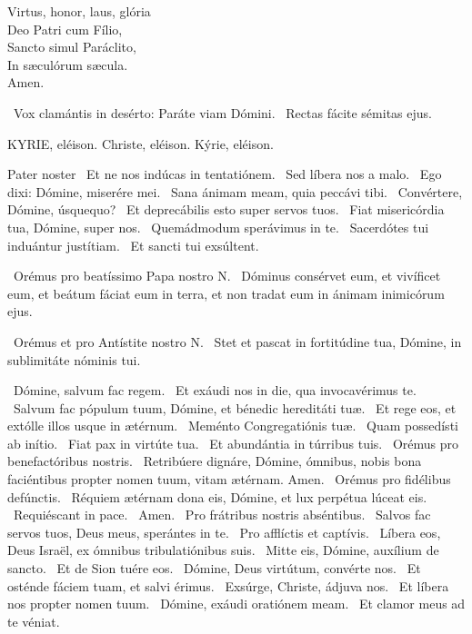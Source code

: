 Virtus, honor, laus, glória\\
Deo Patri cum Fílio,\\
Sancto simul Paráclito,\\
In sæculórum sæcula.\\
Amen.

\V\ Vox clamántis in desérto: Paráte viam Dómini. \R\ Rectas fácite sémitas ejus.



\label{feria5:precesferiales}

KYRIE, eléison. Christe, eléison. Kýrie, eléison.

Pater noster  \V\ Et ne nos indúcas in tentatiónem. \R\ Sed líbera nos a malo. \V\ Ego dixi: Dómine, miserére mei. \R\ Sana ánimam meam, quia peccávi tibi. \V\ Convértere, Dómine, úsquequo? \R\ Et deprecábilis esto super servos tuos. \V\ Fiat misericórdia tua, Dómine, super nos. \R\ Quemádmodum sperávimus in te. \V\ Sacerdótes tui induántur justítiam. \R\ Et sancti tui exsúltent.

\V\ Orémus pro beatíssimo Papa nostro N. \R\ Dóminus consérvet eum, et vivíficet eum, et beátum fáciat eum in terra, et non tradat eum in ánimam inimicórum ejus.

\V\ Orémus et pro Antístite nostro N. \R\ Stet et pascat in fortitúdine tua, Dómine, in sublimitáte nóminis tui.

\V\ Dómine, salvum fac regem. \R\ Et exáudi nos in die, qua invocavérimus te. \V\ Salvum fac pópulum tuum, Dómine, et bénedic hereditáti tuæ. \R\ Et rege eos, et extólle illos usque in ætérnum. \V\ Meménto Congregatiónis tuæ. \R\ Quam possedísti ab inítio. \V\ Fiat pax in virtúte tua. \R\ Et abundántia in túrribus tuis. \V\ Orémus pro benefactóribus nostris. \R\ Retribúere dignáre, Dómine, ómnibus, nobis bona faciéntibus propter nomen tuum, vitam ætérnam. Amen. \V\ Orémus pro fidélibus defúnctis. \R\ Réquiem ætérnam dona eis, Dómine, et lux perpétua lúceat eis. \V\ Requiéscant in pace. \R\ Amen. \V\ Pro frátribus nostris abséntibus. \R\ Salvos fac servos tuos, Deus meus, sperántes in te. \V\ Pro afflíctis et captívis. \R\ Líbera eos, Deus Israël, ex ómnibus tribulatiónibus suis. \V\ Mitte eis, Dómine, auxílium de sancto. \R\ Et de Sion tuére eos. \V\ Dómine, Deus virtútum, convérte nos. \R\ Et osténde fáciem tuam, et salvi érimus. \V\ Exsúrge, Christe, ádjuva nos. \R\ Et líbera nos propter nomen tuum. \V\ Dómine, exáudi oratiónem meam. \R\ Et clamor meus ad te véniat.

